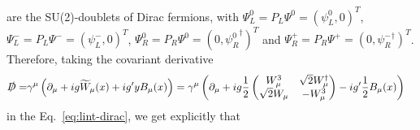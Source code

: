 %
are the SU(2)-doublets of Dirac fermions,
%
with $\Psi_{L}^0=P_{L}\Psi^0=(\psi_L^0,0)^{T}$,  $\Psi_{L}^{-}=P_{L}\Psi^{-}=(\psi_L^{-},0)^{T}$, 
$\Psi_{R}^0=P_{R}\Psi^0=(0,{\psi_R^0}^{\dagger})^{T}$ and 
$\Psi_{R}^+=P_{R}\Psi^+ =(0,{\psi_R^-}^{\dagger})^{T}$.
%
Therefore, taking the covariant derivative~\cite{Pich:2005mk}
%
\begin{align}
\label{eq:devcov}
\slashed{D}=&\gamma^{\mu}\left(\partial_{\mu}+ig\widetilde{W}_{\mu}(x)+ig'yB_{\mu}(x)\right)
=\gamma^{\mu}\left(\partial_{\mu}
+ig\dfrac{1}{2}\begin{pmatrix}
W_{\mu}^3 & \sqrt{2}W_{\mu}^{\dagger} \\
\sqrt{2}W_{\mu} & -W_{\mu}^3
\end{pmatrix}
-ig'\dfrac{1}{2} B_{\mu}(x)\right)
\end{align}
%
in the Eq.~\eqref{eq:lint-dirac}, we get explicitly that
%
